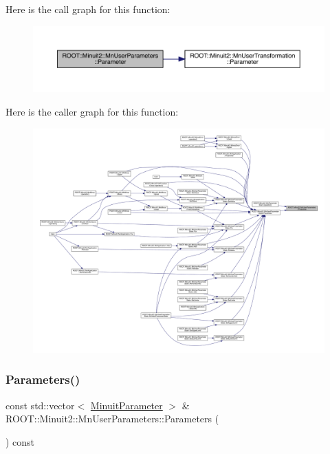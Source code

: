 Here is the call graph for this function\+:\nopagebreak
\begin{figure}[H]
\begin{center}
\leavevmode
\includegraphics[width=350pt]{d6/d10/classROOT_1_1Minuit2_1_1MnUserParameters_a12ee4c4660c21a660fb5f9d1f30b2fc2_cgraph}
\end{center}
\end{figure}
Here is the caller graph for this function\+:\nopagebreak
\begin{figure}[H]
\begin{center}
\leavevmode
\includegraphics[width=350pt]{d6/d10/classROOT_1_1Minuit2_1_1MnUserParameters_a12ee4c4660c21a660fb5f9d1f30b2fc2_icgraph}
\end{center}
\end{figure}
\mbox{\label{classROOT_1_1Minuit2_1_1MnUserParameters_a6b6a4cf33fb9e482a193db522763cd76}} 
\subsubsection{\texorpdfstring{Parameters()}{Parameters()}\hspace{0.1cm}{\footnotesize\ttfamily [1/2]}}
{\footnotesize\ttfamily const std\+::vector$<$ \mbox{\hyperlink{classROOT_1_1Minuit2_1_1MinuitParameter}{Minuit\+Parameter}} $>$ \& R\+O\+O\+T\+::\+Minuit2\+::\+Mn\+User\+Parameters\+::\+Parameters (\begin{DoxyParamCaption}{ }\end{DoxyParamCaption}) const}



